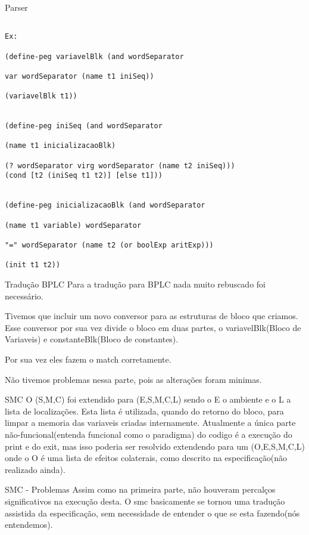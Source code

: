 \documentclass{beamer}
\begin{document}
\begin{frame}{Parser}
\begin{verbatim}

Ex:

(define-peg variavelBlk (and wordSeparator 

var wordSeparator (name t1 iniSeq)) 

(variavelBlk t1))


(define-peg iniSeq (and wordSeparator 

(name t1 inicializacaoBlk) 

(? wordSeparator virg wordSeparator (name t2 iniSeq))) 
(cond [t2 (iniSeq t1 t2)] [else t1]))


(define-peg inicializacaoBlk (and wordSeparator 

(name t1 variable) wordSeparator 

"=" wordSeparator (name t2 (or boolExp aritExp))) 

(init t1 t2))

\end{verbatim}

\end{frame}
\begin{frame}{Tradução BPLC}
Para a tradução para BPLC nada muito rebuscado foi necessário.

Tivemos que incluir um novo conversor para as estruturas de bloco que criamos. Esse conversor por sua vez divide o bloco em duas partes, o variavelBlk(Bloco de Variaveis) e constanteBlk(Bloco de constantes).

Por sua vez eles fazem o match corretamente.

Não tivemos problemas nessa parte, pois as alterações foram minimas.
\end{frame}

\begin{frame}{SMC}
O (S,M,C) foi extendido para (E,S,M,C,L) sendo o E o ambiente e o L a lista de localizações. Esta lista é utilizada, quando do retorno do bloco, para limpar a memoria das
variaveis criadas internamente. Atualmente a única parte não-funcional(entenda funcional como o paradigma) do codigo é a execução do print e do exit, mas isso poderia ser
resolvido extendendo para um (O,E,S,M,C,L) onde o O é uma lista de efeitos colaterais, como descrito na especificação(não realizado ainda).
\end{frame}

\begin{frame}{SMC - Problemas}
Assim como na primeira parte, não houveram percalços significativos na execução desta. O smc basicamente se tornou uma tradução assistida da especificação, sem necessidade
de entender o que se esta fazendo(nós entendemos).
\end{frame}
\end{document}
